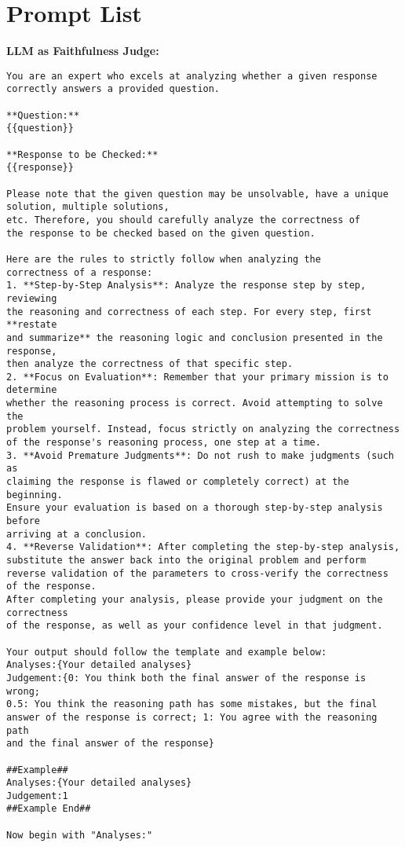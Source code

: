 \section{Prompt List}
\textbf{LLM as Faithfulness Judge:}
\label{sec:prompt_judge}
\begin{lstlisting}
You are an expert who excels at analyzing whether a given response 
correctly answers a provided question.

**Question:**
{{question}}

**Response to be Checked:**
{{response}}

Please note that the given question may be unsolvable, have a unique solution, multiple solutions,
etc. Therefore, you should carefully analyze the correctness of
the response to be checked based on the given question.

Here are the rules to strictly follow when analyzing the
correctness of a response:
1. **Step-by-Step Analysis**: Analyze the response step by step, reviewing
the reasoning and correctness of each step. For every step, first **restate
and summarize** the reasoning logic and conclusion presented in the response,
then analyze the correctness of that specific step.
2. **Focus on Evaluation**: Remember that your primary mission is to determine
whether the reasoning process is correct. Avoid attempting to solve the
problem yourself. Instead, focus strictly on analyzing the correctness
of the response's reasoning process, one step at a time.
3. **Avoid Premature Judgments**: Do not rush to make judgments (such as
claiming the response is flawed or completely correct) at the beginning.
Ensure your evaluation is based on a thorough step-by-step analysis before
arriving at a conclusion.
4. **Reverse Validation**: After completing the step-by-step analysis,
substitute the answer back into the original problem and perform
reverse validation of the parameters to cross-verify the correctness
of the response.
After completing your analysis, please provide your judgment on the correctness
of the response, as well as your confidence level in that judgment.

Your output should follow the template and example below:
Analyses:{Your detailed analyses}
Judgement:{0: You think both the final answer of the response is wrong;
0.5: You think the reasoning path has some mistakes, but the final
answer of the response is correct; 1: You agree with the reasoning path
and the final answer of the response}

##Example##
Analyses:{Your detailed analyses}
Judgement:1
##Example End##

Now begin with "Analyses:"
\end{lstlisting}

